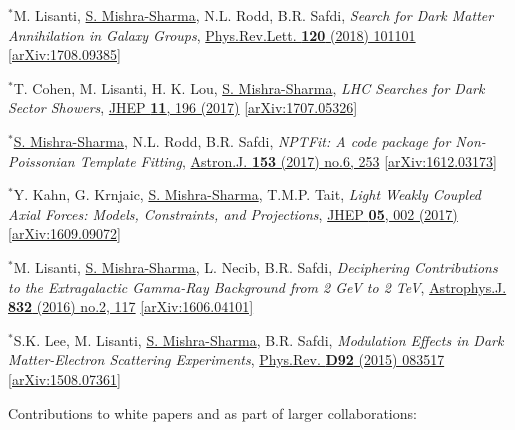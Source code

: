 \documentclass[letterpaper,11pt]{article}
\newenvironment{packed_enumerate}[1][]{
\begin{etaremune}[#1]
  \setlength{\itemsep}{3.7pt}
  \setlength{\parskip}{0pt}
  \setlength{\parsep}{0pt}}{\end{etaremune}
}
\begin{document}
\begin{packed_enumerate}[start=37]
  \item $^*$M. Lisanti, \underline{S. Mishra-Sharma}, N.L. Rodd, B.R. Safdi, \emph{Search for Dark Matter Annihilation in Galaxy Groups},  \href{https://journals.aps.org/prl/abstract/10.1103/PhysRevLett.120.101101}{Phys.Rev.Lett. \textbf{120} (2018) 101101} \href{https://arxiv.org/abs/1708.09385}{[arXiv:1708.09385]}

  \item $^*$T. Cohen, M. Lisanti, H. K. Lou, \underline{S. Mishra-Sharma}, \emph{LHC Searches for Dark Sector Showers},  \href{https://link.springer.com/article/10.1007/JHEP11(2017)196}{JHEP \textbf{11}, 196 (2017)}  \href{https://arxiv.org/abs/1707.05326}{ [arXiv:1707.05326]}

  \item $^*$\underline{S. Mishra-Sharma}, N.L. Rodd, B.R. Safdi, \emph{NPTFit: A code package for Non-Poissonian Template Fitting},  \href{http://iopscience.iop.org/article/10.3847/1538-3881/aa6d5f/meta}{Astron.J. \textbf{153} (2017) no.6, 253}  \href{https://arxiv.org/abs/1612.03173}{ [arXiv:1612.03173]}

  \item $^*$Y. Kahn, G. Krnjaic, \underline{S. Mishra-Sharma}, T.M.P. Tait, \emph{Light Weakly Coupled Axial Forces: Models, Constraints, and Projections},  \href{https://link.springer.com/article/10.1007%2FJHEP05%282017%29002}{JHEP \textbf{05}, 002 (2017)}  \href{https://arxiv.org/abs/1609.09072}{[arXiv:1609.09072]}

  \item $^*$M. Lisanti, \underline{S. Mishra-Sharma}, L. Necib, B.R. Safdi, \emph{Deciphering Contributions to the Extragalactic Gamma-Ray Background from 2 GeV to 2 TeV},  \href{http://iopscience.iop.org/article/10.3847/0004-637X/832/2/117/meta}{Astrophys.J. \textbf{832} (2016) no.2, 117} \href{https://arxiv.org/abs/1606.04101}{[arXiv:1606.04101]}

  \item $^*$S.K. Lee, M. Lisanti, \underline{S. Mishra-Sharma}, B.R. Safdi, \emph{Modulation Effects in Dark Matter-Electron Scattering Experiments}, \href{https://journals.aps.org/prd/abstract/10.1103/PhysRevD.92.083517}{Phys.Rev. \textbf{D92} (2015) 083517} \href{https://arxiv.org/abs/1508.07361}{[arXiv:1508.07361]}
\end{packed_enumerate}

\noindent
Contributions to white papers and as part of larger collaborations:
\end{document}
